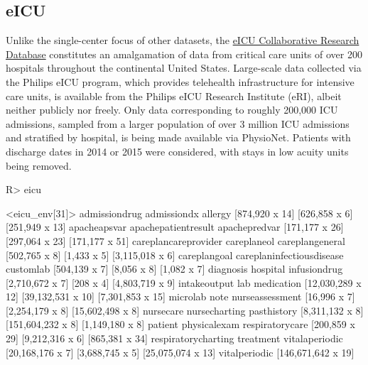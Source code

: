 \documentclass[
  notitle,
  nojss,
  noheadings]{jss}
\begin{document}
\hypertarget{eicu}{%
\subsection{eICU}\label{eicu}}

Unlike the single-center focus of other datasets, the
\href{https://physionet.org/content/eicu-crd/2.0/}{eICU Collaborative
Research Database} constitutes an amalgamation of data from critical
care units of over 200 hospitals throughout the continental United
States. Large-scale data collected via the Philips eICU program, which
provides telehealth infrastructure for intensive care units, is
available from the Philips eICU Research Institute (eRI), albeit neither
publicly nor freely. Only data corresponding to roughly 200,000 ICU
admissions, sampled from a larger population of over 3 million ICU
admissions and stratified by hospital, is being made available via
PhysioNet. Patients with discharge dates in 2014 or 2015 were
considered, with stays in low acuity units being removed.

\begin{CodeChunk}
\begin{CodeInput}
R> eicu
\end{CodeInput}
\begin{CodeOutput}
<eicu_env[31]>
            admissiondrug               admissiondx                   allergy 
           [874,920 x 14]             [626,858 x 6]            [251,949 x 13] 
             apacheapsvar       apachepatientresult             apachepredvar 
           [171,177 x 26]            [297,064 x 23]            [171,177 x 51] 
     careplancareprovider               careplaneol           careplangeneral 
            [502,765 x 8]               [1,433 x 5]           [3,115,018 x 6] 
             careplangoal careplaninfectiousdisease                 customlab 
            [504,139 x 7]               [8,056 x 8]               [1,082 x 7] 
                diagnosis                  hospital              infusiondrug 
          [2,710,672 x 7]                 [208 x 4]           [4,803,719 x 9] 
             intakeoutput                       lab                medication 
        [12,030,289 x 12]         [39,132,531 x 10]          [7,301,853 x 15] 
                 microlab                      note           nurseassessment 
             [16,996 x 7]           [2,254,179 x 8]          [15,602,498 x 8] 
                nursecare             nursecharting               pasthistory 
          [8,311,132 x 8]         [151,604,232 x 8]           [1,149,180 x 8] 
                  patient              physicalexam           respiratorycare 
           [200,859 x 29]           [9,212,316 x 6]            [865,381 x 34] 
      respiratorycharting                 treatment            vitalaperiodic 
         [20,168,176 x 7]           [3,688,745 x 5]         [25,075,074 x 13] 
            vitalperiodic 
       [146,671,642 x 19] 
\end{CodeOutput}
\end{CodeChunk}
\end{document}
